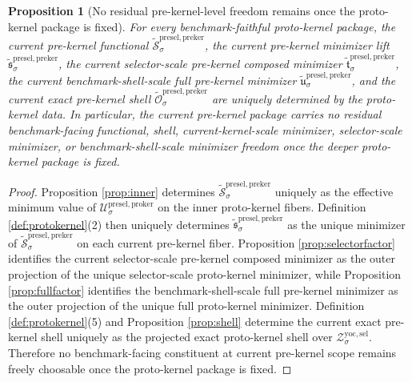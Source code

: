 \documentclass[11pt]{article}
\newcommand{\YoctoSelectorShell}[1]{\mathcal Z_{#1}^{\mathrm{yoc,sel}}}
\newcommand{\ProtoKernelFunctional}[1]{\mathscr U_{#1}^{\mathrm{presel,proker}}}
\newcommand{\InducedPreKernelFunctional}[1]{\widetilde{\mathscr S}_{#1}^{\mathrm{presel,preker}}}
\newcommand{\InducedPreKernelMinLift}[1]{\widetilde{\mathfrak s}_{#1}^{\mathrm{presel,preker}}}
\newcommand{\InducedPreKernelComposedMin}[1]{\widetilde{\mathfrak t}_{#1}^{\mathrm{presel,preker}}}
\newcommand{\InducedPreKernelFullMin}[1]{\widetilde{\mathfrak u}_{#1}^{\mathrm{presel,preker}}}
\newcommand{\InducedPreKernelShell}[1]{\widetilde{\mathcal O}_{#1}^{\mathrm{presel,preker}}}
\newtheorem{proposition}{Proposition}
\begin{document}
\begin{proposition}[No residual pre-kernel-level freedom remains once the proto-kernel package is fixed]
\label{prop:nofreedom}
For every benchmark-faithful proto-kernel package, the current pre-kernel functional \(\InducedPreKernelFunctional{\sigma}\), the current pre-kernel minimizer lift \(\InducedPreKernelMinLift{\sigma}\), the current selector-scale pre-kernel composed minimizer \(\InducedPreKernelComposedMin{\sigma}\), the current benchmark-shell-scale full pre-kernel minimizer \(\InducedPreKernelFullMin{\sigma}\), and the current exact pre-kernel shell \(\InducedPreKernelShell{\sigma}\) are uniquely determined by the proto-kernel data. In particular, the current pre-kernel package carries no residual benchmark-facing functional, shell, current-kernel-scale minimizer, selector-scale minimizer, or benchmark-shell-scale minimizer freedom once the deeper proto-kernel package is fixed.
\end{proposition}

\begin{proof}
Proposition \ref{prop:inner} determines \(\InducedPreKernelFunctional{\sigma}\) uniquely as the effective minimum value of \(\ProtoKernelFunctional{\sigma}\) on the inner proto-kernel fibers. Definition \ref{def:protokernel}(2) then uniquely determines \(\InducedPreKernelMinLift{\sigma}\) as the unique minimizer of \(\InducedPreKernelFunctional{\sigma}\) on each current pre-kernel fiber. Proposition \ref{prop:selectorfactor} identifies the current selector-scale pre-kernel composed minimizer as the outer projection of the unique selector-scale proto-kernel minimizer, while Proposition \ref{prop:fullfactor} identifies the benchmark-shell-scale full pre-kernel minimizer as the outer projection of the unique full proto-kernel minimizer. Definition \ref{def:protokernel}(5) and Proposition \ref{prop:shell} determine the current exact pre-kernel shell uniquely as the projected exact proto-kernel shell over \(\YoctoSelectorShell{\sigma}\). Therefore no benchmark-facing constituent at current pre-kernel scope remains freely choosable once the proto-kernel package is fixed.
\end{proof}
\end{document}
